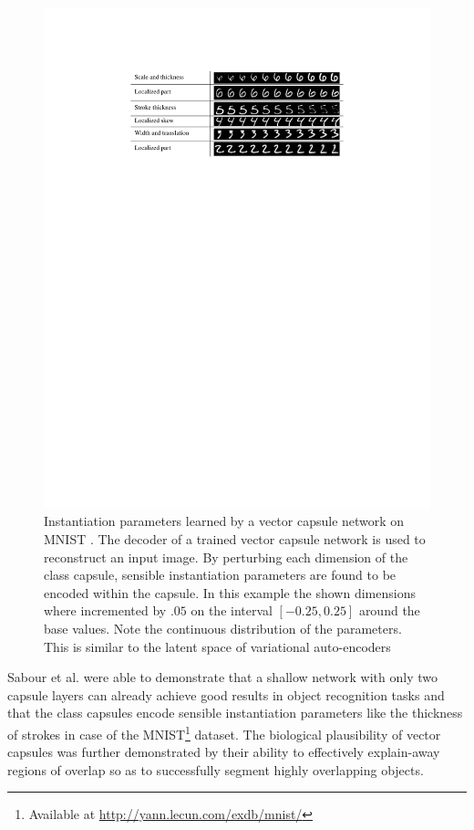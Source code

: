 \begin{figure}
    \centering
    \includegraphics[width=.8\textwidth]{figures/vector-capsules-parameters.pdf}
\caption[Instantiation parameters learned by a vector capsule network on MNIST]{Instantiation parameters learned by a vector capsule network on MNIST \cite{sabour2017dynamic}. The decoder of a trained vector capsule network is used to reconstruct an input image. By perturbing each dimension of the class capsule, sensible instantiation parameters are found to be encoded within the capsule. In this example the shown dimensions where incremented by $\num{.05}$ on the interval $[\num{-0.25}, \num{0.25}]$ around the base values. Note the continuous distribution of the parameters. This is similar to the latent space of variational auto-encoders \cite{kingma2013auto} }\label{fig:vector-capsules-parameters}
\end{figure}\noindent
Sabour et al. were able to demonstrate that a shallow network with only two capsule layers can already achieve good results in object recognition tasks and that the class capsules encode sensible instantiation parameters like the thickness of strokes in case of the MNIST\footnote{Available at \url{http://yann.lecun.com/exdb/mnist/}} dataset. The biological plausibility of vector capsules was further demonstrated by their ability to effectively explain-away regions of overlap so as to successfully segment highly overlapping objects.
